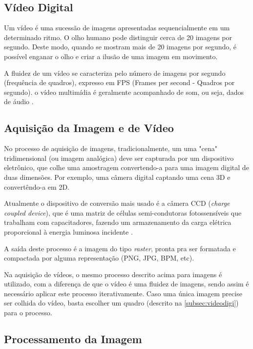  \subsection{Vídeo Digital}\label{subsec:videodigi}
 
 Um vídeo é uma sucessão de imagens apresentadas sequencialmente em um determinado ritmo. O olho humano pode distinguir cerca de 20 imagens por segundo. Deste modo, quando se mostram mais de 20 imagens por segundo, é possível enganar o olho e criar a ilusão de uma imagem em movimento. 
 
 A fluidez de um vídeo se caracteriza pelo número de imagens por segundo (frequência de quadros), expresso em FPS (Frames per second - Quadros por segundo). o vídeo multimídia é geralmente acompanhado de som, ou seja, dados de áudio \cite{ccm_video_digi}.

\subsection{Aquisição da Imagem e de Vídeo}\label{subsec:aquisicao_video}

No processo de aquisição de imagens, tradicionalmente, um uma "cena" tridimensional (ou imagem analógica) deve ser capturada por um dispositivo eletrônico, que colhe uma amostragem convertendo-a para uma imagem digital de duas dimensões. Por exemplo, uma câmera digital captando uma cena 3D e convertêndo-a em 2D.

Atualmente o dispositivo de conversão mais usado  é a câmera CCD (\textit{charge coupled device}), que é uma matriz de células semi-condutoras fotossensíveis que trabalham com capacitadores, fazendo um armazenamento da carga elétrica proporcional à energia luminosa incidente \cite{gonzalez_woods}.

A saída deste processo é a imagem do tipo \textit{raster}, pronta pra ser formatada e compactada por alguma representação (PNG, JPG, BPM, etc). 


Na aquisição de vídeos, o mesmo processo descrito acima para imagens é utilizado, com a diferença de que o vídeo é uma fluidez de imagens, sendo assim é necessário aplicar este processo iterativamente. Caso uma única imagem precise ser colhida do vídeo, basta escolher um quadro (descrito na \autoref{subsec:videodigi}) para o processo.

\subsection{Processamento da Imagem}\label{subsec:processamento}

